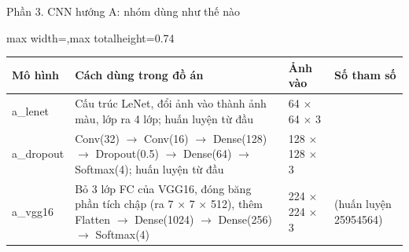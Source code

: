 \documentclass[aspectratio=169,10pt]{beamer}
\begin{document}
\begin{frame}{Phần 3. CNN hướng A: nhóm dùng như thế nào}
\begin{center}\begin{adjustbox}{max width=\linewidth,max totalheight=0.74\textheight}
\begin{tabular}{l >{\raggedright\arraybackslash}p{7.6cm} l >{\raggedright\arraybackslash}p{2.6cm}}\toprule
\textbf{Mô hình} & \textbf{Cách dùng trong đồ án} & \textbf{Ảnh vào} & \textbf{Số tham số} \\ \midrule
a\_lenet & Cấu trúc LeNet, đổi ảnh vào thành ảnh màu, lớp ra 4 lớp; huấn luyện từ đầu & 64 $\times$ 64 $\times$ 3 & 337976 \\
a\_dropout & Conv(32) $\rightarrow$ Conv(16) $\rightarrow$ Dense(128) $\rightarrow$ Dropout(0.5) $\rightarrow$ Dense(64) $\rightarrow$ Softmax(4); huấn luyện từ đầu & 128 $\times$ 128 $\times$ 3 & 1746260 \\
a\_vgg16 & Bỏ 3 lớp FC của VGG16, đóng băng phần tích chập (ra 7 $\times$ 7 $\times$ 512), thêm Flatten $\rightarrow$ Dense(1024) $\rightarrow$ Dense(256) $\rightarrow$ Softmax(4) & 224 $\times$ 224 $\times$ 3 & 40669252 (huấn luyện 25954564) \\
\bottomrule\end{tabular}
\end{adjustbox}\end{center}
\end{frame}
\end{document}

